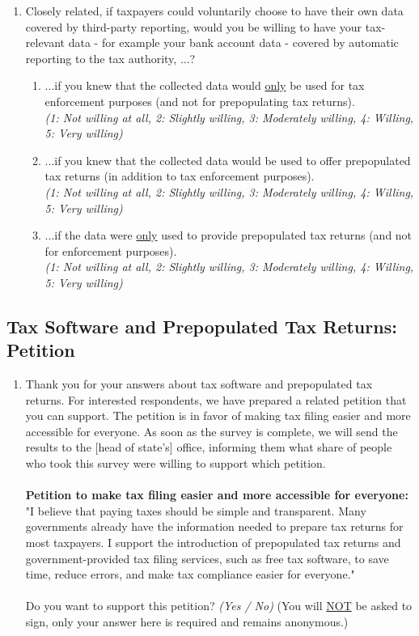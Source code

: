 \documentclass[11pt]{article}
\begin{document}
\begin{enumerate}[resume]
    \item Closely related, if taxpayers could voluntarily choose to have their own data covered by third-party reporting, would you be willing to have your tax-relevant data - for example your bank account data - covered by automatic reporting to the tax authority, ...?   \\
    \begin{enumerate}
    \item ...if you knew that the collected data would \underline{only} be used for tax enforcement  purposes (and not for prepopulating tax returns).\\     \textit{(1: Not willing at all, 2: Slightly willing, 3: Moderately willing, 4: Willing, 5: Very willing)}
    \item ...if you knew that the collected data would be used to offer prepopulated tax returns (in addition to tax enforcement purposes).\\     \textit{(1: Not willing at all, 2: Slightly willing, 3: Moderately willing, 4: Willing, 5: Very willing)}
    \item ...if the data were \underline{only} used to provide prepopulated tax returns (and not for enforcement purposes).\\     \textit{(1: Not willing at all, 2: Slightly willing, 3: Moderately willing, 4: Willing, 5: Very willing)}
\end{enumerate}
\end{enumerate}
\subsection*{Tax Software and Prepopulated Tax Returns: Petition} 
\begin{enumerate}[resume]
    \item Thank you for your answers about tax software and prepopulated tax returns. For interested respondents, we have prepared a related petition that you can support. The petition is in favor of making tax filing easier and more accessible for everyone. As soon as the survey is complete, we will send the results to the [head of state’s] office, informing them what share of people who took this survey were willing to support which petition. \\ \\
    \textbf{Petition to make tax filing easier and more accessible for everyone:} "I believe that paying taxes should be simple and transparent. Many governments already have the information needed to prepare tax returns for most taxpayers. I support the introduction of prepopulated tax returns and government-provided tax filing services, such as free tax software, to save time, reduce errors, and make tax compliance easier for everyone."\\ \\
    Do you want to support this petition? \textit{(Yes / No)} (You will \underline{NOT} be asked to sign, only your answer here is required and remains anonymous.)
\end{enumerate}
\end{document}
